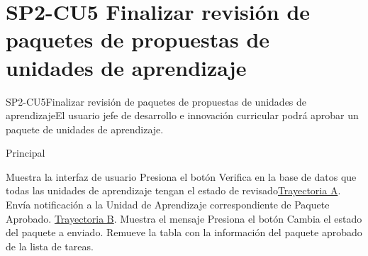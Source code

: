﻿\chapter{SP2-CU5 Finalizar revisión de paquetes de propuestas de unidades de aprendizaje}

\begin{UseCase}{SP2-CU5}{Finalizar revisión de paquetes de propuestas de unidades de aprendizaje}{El usuario jefe de desarrollo e innovación curricular podrá aprobar un paquete de unidades de aprendizaje.}
\end{UseCase}

\begin{UCtrayectoria}{Principal}


    \UCpaso Muestra la interfaz de usuario 
    \UCpaso[\UCactor] Presiona el botón 
    \UCpaso Verifica en la base de datos que todas las unidades de aprendizaje tengan el estado de revisado\hyperref[SP2-CU5-A]{Trayectoria A}.
    \UCpaso Envía notificación a la Unidad de Aprendizaje correspondiente de Paquete Aprobado. \hyperref[SP2-CU5-B]{Trayectoria B}.
    \UCpaso Muestra el mensaje 
    \UCpaso[\UCactor] Presiona el botón 
    \UCpaso Cambia el estado del paquete a enviado.
    \UCpaso Remueve la tabla con la información del paquete aprobado de la lista de tareas.

\end{UCtrayectoria}


